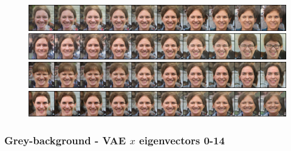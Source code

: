 \documentclass{article}
\begin{document}
\begin{figure}[H]
  \includegraphics[width=0.9\linewidth]{eigen/raw_gan_26.png}
  \includegraphics[width=0.9\linewidth]{eigen/raw_gan_27.png}
  \includegraphics[width=0.9\linewidth]{eigen/raw_gan_28.png}
  \includegraphics[width=0.9\linewidth]{eigen/raw_gan_29.png}

\end{figure}
\newpage


\subsubsection*{Grey-background - VAE $x$ eigenvectors 0-14}
\end{document}
